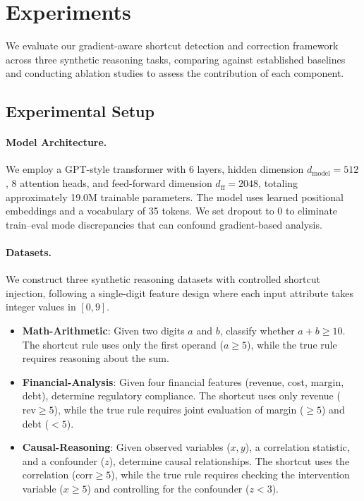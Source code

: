 \section{Experiments}
\label{sec:experiments}

We evaluate our gradient-aware shortcut detection and correction framework across three synthetic reasoning tasks, comparing against established baselines and conducting ablation studies to assess the contribution of each component.

\subsection{Experimental Setup}
\label{sec:exp_setup}

\paragraph{Model Architecture.}
We employ a GPT-style transformer with 6 layers, hidden dimension $d_{\text{model}} = 512$, 8 attention heads, and feed-forward dimension $d_{\text{ff}} = 2048$, totaling approximately 19.0M trainable parameters. The model uses learned positional embeddings and a vocabulary of 35 tokens. We set dropout to 0 to eliminate train--eval mode discrepancies that can confound gradient-based analysis.

\paragraph{Datasets.}
We construct three synthetic reasoning datasets with controlled shortcut injection, following a single-digit feature design where each input attribute takes integer values in $[0, 9]$.

\begin{itemize}[leftmargin=*, itemsep=2pt]
    \item \textbf{Math-Arithmetic}: Given two digits $a$ and $b$, classify whether $a + b \geq 10$. The shortcut rule uses only the first operand ($a \geq 5$), while the true rule requires reasoning about the sum.
    \item \textbf{Financial-Analysis}: Given four financial features (revenue, cost, margin, debt), determine regulatory compliance. The shortcut uses only revenue ($\text{rev} \geq 5$), while the true rule requires joint evaluation of margin ($\geq 5$) and debt ($< 5$).
    \item \textbf{Causal-Reasoning}: Given observed variables ($x, y$), a correlation statistic, and a confounder ($z$), determine causal relationships. The shortcut uses the correlation ($\text{corr} \geq 5$), while the true rule requires checking the intervention variable ($x \geq 5$) and controlling for the confounder ($z < 3$).
\end{itemize}

